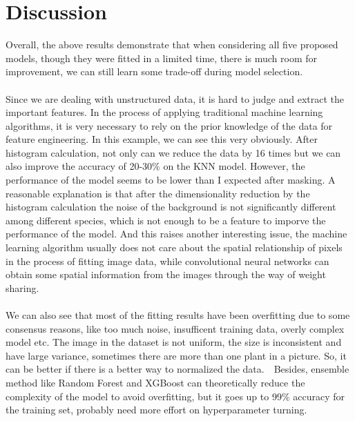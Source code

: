 \documentclass[12pt]{article}
\begin{document}
\section{Discussion}
Overall, the above results demonstrate that when considering all five proposed models, though they were fitted in a limited time, there is much room for improvement, we can still learn some trade-off during model selection.
\\
\\
Since we are dealing with unstructured data, it is hard to judge and extract the important features. In the process of applying traditional machine learning algorithms, it is very necessary to rely on the prior knowledge of the data for feature engineering. In this example, we can see this very obviously. After histogram calculation, not only can we reduce the data by 16 times but we can also improve the accuracy of 20-30\% on the KNN model. However, the performance of the model seems to be lower than I expected after masking. A reasonable explanation is that after the dimensionality reduction by the histogram calculation the noise of the background is not significantly different among different species, which is not enough to be a feature to imporve the performance of the model. And this raises another interesting issue, the machine learning algorithm usually does not care about the spatial relationship of pixels in the process of fitting image data, while convolutional neural networks can obtain some spatial information from the images through the way of weight sharing.  
\\
\\
We can also see that most of the fitting results have been overfitting due to some consensus reasons, like too much noise, insufficent training data, overly complex model etc. The image in the dataset is not uniform, the size is inconsistent and have large variance, sometimes there are more than one plant in a picture. So, it can be better if there is a better way to normalized the data.　Besides, ensemble method like Random Forest and XGBoost can theoretically reduce the complexity of the model to avoid overfitting, but it goes up to 99\% accuracy for the training set, probably need more effort on hyperparameter turning.




\end{document}
